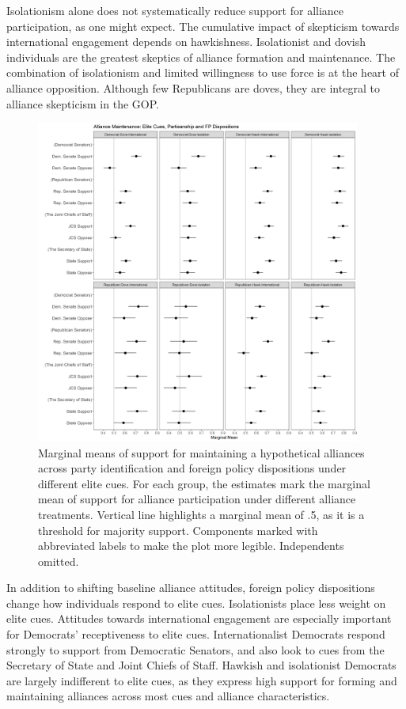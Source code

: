 \documentclass[12pt]{article}
\begin{document}
Isolationism alone does not systematically reduce support for alliance participation, as one might expect.
The cumulative impact of skepticism towards international engagement depends on hawkishness. 
Isolationist and dovish individuals are the greatest skeptics of alliance formation and maintenance. 
The combination of isolationism and limited willingness to use force is at the heart of alliance opposition. 
Although few Republicans are doves, they are integral to alliance skepticism in the GOP. 


\begin{figure}
	\centering
		\includegraphics[width=0.95\textwidth]{../figures/party-dispo-main-el.png}
	\caption{Marginal means of support for maintaining a hypothetical alliances across party identification and foreign policy dispositions under different elite cues. For each group, the estimates mark the marginal mean of support for alliance participation under different alliance treatments. Vertical line highlights a marginal mean of .5, as it is a threshold for majority support. Components marked with abbreviated labels to make the plot more legible. Independents omitted.}
	\label{fig:party-dispo-main-el}
\end{figure}


In addition to shifting baseline alliance attitudes, foreign policy dispositions change how individuals respond to elite cues. 
Isolationists place less weight on elite cues. 
Attitudes towards international engagement are especially important for Democrats' receptiveness to elite cues. 
Internationalist Democrats respond strongly to support from Democratic Senators, and also look to cues from the Secretary of State and Joint Chiefs of Staff. 
Hawkish and isolationist Democrats are largely indifferent to elite cues, as they express high support for forming and maintaining alliances across most cues and alliance characteristics. 
\end{document}
